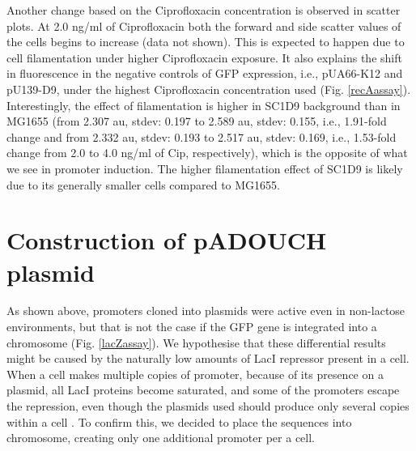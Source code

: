 Another change based on the Ciprofloxacin concentration is observed in scatter plots.
At 2.0 ng/ml of Ciprofloxacin both the forward and side scatter values of the cells begins to increase (data not shown).
This is expected to happen due to cell filamentation under higher Ciprofloxacin exposure.
It also explains the shift in fluorescence in the negative controls of GFP expression, i.e., pUA66-K12 and pU139-D9, under the highest Ciprofloxacin concentration used (Fig. \ref{recAassay}).
Interestingly, the effect of filamentation is higher in SC1\textunderscore D9 background than in MG1655 (from 2.307 au, stdev: 0.197 to 2.589 au, stdev: 0.155, i.e., 1.91-fold change and from 2.332 au, stdev: 0.193 to 2.517 au, stdev: 0.169, i.e., 1.53-fold change from 2.0 to 4.0 ng/ml of Cip, respectively), which is the opposite of what we see in  promoter induction.
The higher filamentation effect of SC1\textunderscore D9 is likely due to its generally smaller cells compared to MG1655.


\section{Construction of pADOUCH plasmid}
As shown above,  promoters cloned into plasmids were active even in non-lactose environments, but that is not the case if the GFP gene is integrated into a chromosome (Fig. \ref{lacZassay}).
We hypothesise that these differential results might be caused by the naturally low amounts of LacI repressor present in a cell.
When a cell makes multiple copies of  promoter, because of its presence on a plasmid, all LacI proteins become saturated, and some of the promoters escape the repression, even though the plasmids used should produce only several copies within a cell \cite{zaslaver2006comprehensive}.
To confirm this, we decided to place the  sequences into chromosome, creating only one additional  promoter per a cell.

